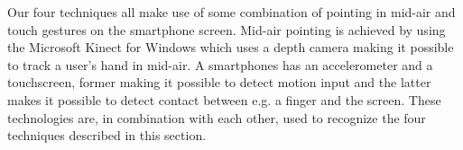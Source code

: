 Our four techniques all make use of some combination of pointing in mid-air and touch gestures on the smartphone screen.
Mid-air pointing is achieved by using the Microsoft Kinect for Windows which uses a depth camera making it possible to track a user's hand in mid-air.
A smartphones has an accelerometer and a touchscreen, former making it possible to detect motion input and the latter makes it possible to detect contact between e.g. a finger and the screen.
These technologies are, in combination with each other, used to recognize the four techniques described in this section. 